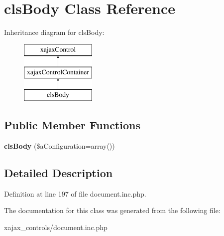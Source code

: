 \hypertarget{classclsBody}{
\section{clsBody Class Reference}
\label{classclsBody}
}
Inheritance diagram for clsBody:\begin{figure}[H]
\begin{center}
\leavevmode
\includegraphics[height=3.000000cm]{classclsBody}
\end{center}
\end{figure}
\subsection*{Public Member Functions}
\begin{DoxyCompactItemize}
\item 
\hypertarget{classclsBody_a01d1107b3bc0c5fa9431b9359e432d35}{
{\bfseries clsBody} (\$aConfiguration=array())}
\label{classclsBody_a01d1107b3bc0c5fa9431b9359e432d35}

\end{DoxyCompactItemize}


\subsection{Detailed Description}


Definition at line 197 of file document.inc.php.



The documentation for this class was generated from the following file:\begin{DoxyCompactItemize}
\item 
xajax\_\-controls/document.inc.php\end{DoxyCompactItemize}
